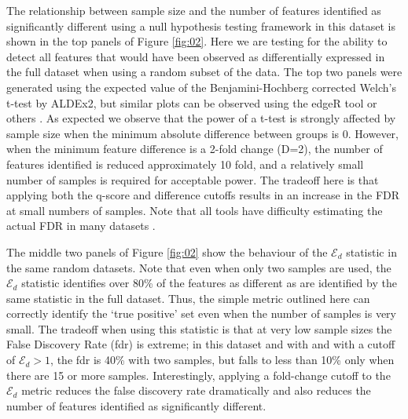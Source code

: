 The relationship between sample size and the number of features identified as significantly different using a null hypothesis testing framework in this dataset is shown in the top  panels of Figure \ref{fig:02}.  Here we are testing for the ability to detect all features that would have been observed as differentially expressed in the full dataset when using a random subset of the data. The top two panels were generated using the expected value of the Benjamini-Hochberg corrected Welch's t-test by ALDEx2, but similar plots can be observed using the edgeR tool  or others \citep{Schurch:2016aa}. As expected we observe that the power of a t-test is strongly affected by sample size when the minimum absolute difference between groups is 0. However, when the minimum feature difference is a 2-fold change (D=2), the number of features identified is reduced approximately 10 fold, and a relatively small number of samples is required for acceptable power. The tradeoff here is that applying both the q-score and difference cutoffs results in an increase in the FDR at small numbers of samples. Note that all tools have difficulty estimating the actual FDR in many datasets \citep{Thorsen:2016aa,hawinkel2017}. 

The middle two panels of Figure \ref{fig:02} show the behaviour of the $\mathcal{E}_{d}$ statistic in the same random datasets. Note that even when only two samples are used, the $\mathcal{E}_{d}$ statistic identifies over 80\% of the features as different as are identified by the same statistic in the full dataset. Thus, the simple metric outlined here  can correctly identify the `true positive' set even when the number of samples is very small. The tradeoff when using this statistic is that at very low sample sizes the False Discovery Rate (fdr) is extreme; in this dataset and with and with a cutoff of $\mathcal{E}_{d} > 1$, the fdr is 40\% with two samples, but falls to less than 10\% only when there are 15 or more samples. Interestingly, applying a fold-change cutoff to the $\mathcal{E}_{d}$ metric reduces the false discovery rate dramatically and also reduces the number of features identified as significantly different. 

